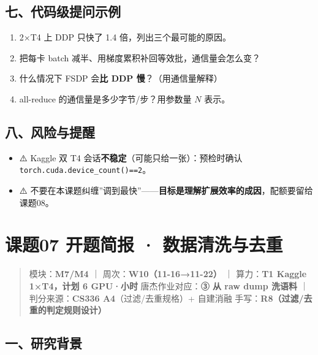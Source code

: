 \documentclass[
  chinese,
  11pt,
]{ctexart}
\providecommand{\tightlist}{%
  \setlength{\itemsep}{0pt}\setlength{\parskip}{0pt}}
\begin{document}
\subsection{七、代码级提问示例}\label{ux4e03ux4ee3ux7801ux7ea7ux63d0ux95eeux793aux4f8b-3}

\begin{enumerate}
\def\labelenumi{\arabic{enumi}.}
\tightlist
\item
  2×T4 上 DDP 只快了 1.4 倍，列出三个最可能的原因。
\item
  把每卡 batch 减半、用梯度累积补回等效批，通信量会怎么变？
\item
  什么情况下 FSDP 会\textbf{比 DDP 慢}？（用通信量解释）
\item
  all-reduce 的通信量是多少字节/步？用参数量 \(N\) 表示。
\end{enumerate}

\subsection{八、风险与提醒}\label{ux516bux98ceux9669ux4e0eux63d0ux9192-4}

\begin{itemize}
\tightlist
\item
  ⚠️ Kaggle 双 T4 会话\textbf{不稳定}（可能只给一张）：预检时确认 \texttt{torch.cuda.device\_count()==2}。
\item
  ⚠️ 不要在本课题纠缠''调到最快''------\textbf{目标是理解扩展效率的成因}，配额要留给课题08。
\end{itemize}

\newpage

\section{课题07 开题简报 · 数据清洗与去重}\label{ux8bfeux989807-ux5f00ux9898ux7b80ux62a5-ux6570ux636eux6e05ux6d17ux4e0eux53bbux91cd}

\begin{quote}
模块：\textbf{M7/M4} ｜ 周次：\textbf{W10（11-16→11-22）} ｜ 算力：\textbf{T1 Kaggle 1×T4，计划 6 GPU·小时} 唐杰作业对应：\textbf{③ 从 raw dump 洗语料} ｜ 判分来源：\textbf{CS336 A4}（过滤/去重规格）+ 自建消融 手写：\textbf{R8（过滤/去重的判定规则设计）}
\end{quote}

\subsection{一、研究背景}\label{ux4e00ux7814ux7a76ux80ccux666f-5}
\end{document}
